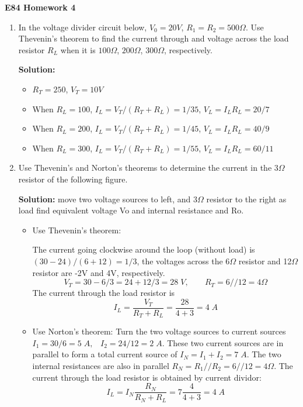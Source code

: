 \usepackage{html}

\begin{center}
{\Large \bf E84 Homework 4}
\end{center}
\begin{enumerate}

\begin{enumerate}

\item In the voltage divider circuit below, $V_0=20V$, $R_1=R_2=500\Omega$. 
Use Thevenin's theorem to find the current through and voltage across the 
load resistor $R_L$ when it is $100\Omega$, $200\Omega$, $300\Omega$, 
respectively.


{\bf Solution:}
\begin{itemize}
\item $R_T=250$, $V_T=10V$
\item When $R_L=100$, $I_L=V_T/(R_T+R_L)=1/35$, $V_L=I_L R_L=20/7$
\item When $R_L=200$, $I_L=V_T/(R_T+R_L)=1/45$, $V_L=I_L R_L=40/9$
\item When $R_L=300$, $I_L=V_T/(R_T+R_L)=1/55$, $V_L=I_L R_L=60/11$
\end{itemize}

\item Use Thevenin's and Norton's theorems to determine the current in the 
$3\Omega$ resistor of the following figure.


{\bf Solution:}
move two voltage sources to left, and 3$\Omega$ resistor to the right as load
find equivalent voltage Vo and internal resistance and Ro.

\begin{itemize}
\item Use Thevenin's theorem:

The current going clockwise around the loop (without load) is $(30-24)/(6+12)=1/3$,
the voltages across the 6$\Omega$ resistor and 12$\Omega$ resistor are -2V and 4V, 
respectively. 
\[ V_T=30-6/3=24+12/3=28\;V,\;\;\;\;\;\;\;R_T=6//12=4\Omega \]
The current through the load resistor is
\[ I_L=\frac{V_T}{R_T+R_L}=\frac{28}{4+3}=4\;A \]

\item Use Norton's theorem:
Turn the two voltage sources to current sources 
$I_1=30/6=5\;A,\;\;\;I_2=24/12=2\;A$. These two current sources are in parallel
to form a total current source of $I_N=I_1+I_2=7\;A$. The two internal resistances
are also in parallel $R_N=R_1//R_2=6//12=4\Omega$. The current through the load
resistor is obtained by current dividor:
\[ I_L=I_N\frac{R_N}{R_N+R_L}=7\frac{4}{4+3}=4\;A \]


\end{itemize}
\end{enumerate}
\end{enumerate}
